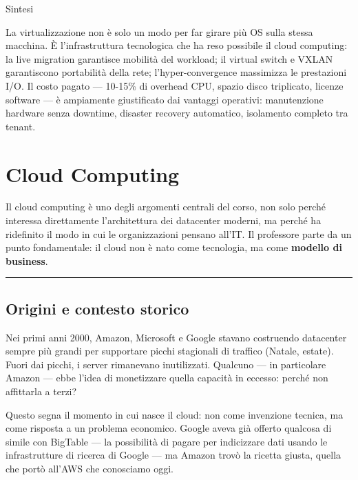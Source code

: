 \documentclass[
  italian,
  openany]{book}
\begin{document}
\begin{calloutnote}{Sintesi}

La virtualizzazione non è solo un modo per far girare più OS sulla
stessa macchina. È l'infrastruttura tecnologica che ha reso possibile il
cloud computing: la live migration garantisce mobilità del workload; il
virtual switch e VXLAN garantiscono portabilità della rete;
l'hyper-convergence massimizza le prestazioni I/O. Il costo pagato ---
10-15\% di overhead CPU, spazio disco triplicato, licenze software --- è
ampiamente giustificato dai vantaggi operativi: manutenzione hardware
senza downtime, disaster recovery automatico, isolamento completo tra
tenant.

\end{calloutnote}

\newpage

\chapter{Cloud Computing}\label{cloud-computing}

Il cloud computing è uno degli argomenti centrali del corso, non solo
perché interessa direttamente l'architettura dei datacenter moderni, ma
perché ha ridefinito il modo in cui le organizzazioni pensano all'IT. Il
professore parte da un punto fondamentale: il cloud non è nato come
tecnologia, ma come \textbf{modello di business}.

\begin{center}\rule{0.5\linewidth}{0.5pt}\end{center}

\section{Origini e contesto storico}\label{origini-e-contesto-storico}

Nei primi anni 2000, Amazon, Microsoft e Google stavano costruendo
datacenter sempre più grandi per supportare picchi stagionali di
traffico (Natale, estate). Fuori dai picchi, i server rimanevano
inutilizzati. Qualcuno --- in particolare Amazon --- ebbe l'idea di
monetizzare quella capacità in eccesso: perché non affittarla a terzi?

Questo segna il momento in cui nasce il cloud: non come invenzione
tecnica, ma come risposta a un problema economico. Google aveva già
offerto qualcosa di simile con BigTable --- la possibilità di pagare per
indicizzare dati usando le infrastrutture di ricerca di Google --- ma
Amazon trovò la ricetta giusta, quella che portò all'AWS che conosciamo
oggi.
\end{document}
